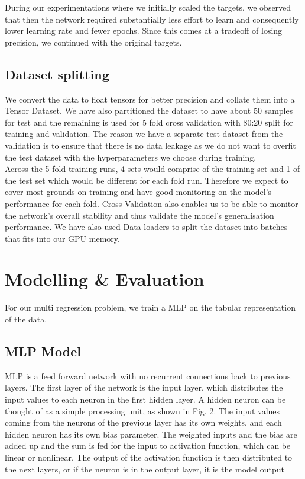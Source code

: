 \documentclass{report} %
\begin{document}
During our experimentations where we initially scaled the targets, we observed that then the network required substantially less effort to learn and consequently lower learning rate and fewer epochs.
Since this comes at a tradeoff of losing precision, we continued with the original targets.\\

\section{Dataset splitting}\label{sec:Dataset splitting}

We convert the data to float tensors for better precision and collate them into a Tensor Dataset.
We have also partitioned the dataset to have about 50 samples for test and the remaining is used for 5 fold cross validation with 80:20 split for training and validation. 
The reason we have a separate test dataset from the validation is to ensure that there is no data leakage as we do not want to 
overfit the test dataset with the hyperparameters we choose during training. \\
Across the 5 fold training runs, 4 sets would comprise of the training set and 1 of the test set which would be different for each fold run.
Therefore we expect to cover most grounds on training and have good monitoring on the model's performance for each fold.
Cross Validation also enables us to be able to monitor the network's overall stability and thus validate the model's generalisation performance.
We have also used Data loaders to split the dataset into batches that fits into our \ac{GPU} memory.

\chapter{Modelling \& Evaluation}

For our multi regression problem, we train a \ac{MLP} on the tabular representation of the data.

\section{\ac{MLP} Model}\label{sec:MLP Model}

\ac{MLP} is a feed forward network with no recurrent connections back to previous layers.
The first layer of the network is the input layer, which distributes the input values to each neuron in the first hidden
layer. A hidden neuron can be thought of as a simple processing unit, as shown in Fig. 2. The input values coming from the neurons of the previous layer has its own weights, and
each hidden neuron has its own bias parameter. The weighted inputs and the bias are added up and the sum is fed for the input to activation function, which can be linear or nonlinear.
The output of the activation function is then distributed to the next layers, or if the neuron is in the output layer, it is the model output
\end{document}
